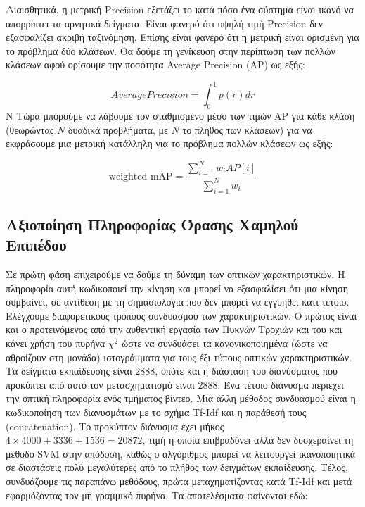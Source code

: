 \documentclass[11pt,a4paper,english,greek,twoside]{../Thesis}
\begin{document}
Διαισθητικά, η μετρική Precision εξετάζει το κατά πόσο ένα σύστημα είναι ικανό να απορρίπτει τα αρνητικά δείγματα. Είναι φανερό ότι υψηλή τιμή Precision δεν εξασφαλίζει ακριβή ταξινόμηση. Επίσης είναι φανερό ότι η μετρική είναι ορισμένη για το πρόβλημα δύο κλάσεων. Θα δούμε τη γενίκευση στην περίπτωση των πολλών κλάσεων αφού ορίσουμε την ποσότητα Average Precision (AP) ως εξής:

\begin{equation}\label{eq:APrecision}
    Average Precision=\int_0^{1} p(r)dr
\end{equation}N
Τώρα μπορούμε να λάβουμε τον σταθμισμένο μέσο των τιμών AP για κάθε κλάση (θεωρώντας $N$ δυαδικά προβλήματα, με $N$ το πλήθος των κλάσεων) για να εκφράσουμε μια μετρική κατάλληλη για το πρόβλημα πολλών κλάσεων ως εξής:

\begin{equation}\label{eq:mAP}
    \text{weighted mAP}=\frac{\sum_{i=1}^{N}w_iAP[i]}{\sum_{i=1}^{N} w_i}
\end{equation}


\subsection{Αξιοποίηση Πληροφορίας Όρασης Χαμηλού Επιπέδου}
Σε πρώτη φάση επιχειρούμε να δούμε τη δύναμη των οπτικών χαρακτηριστικών. Η πληροφορία αυτή κωδικοποιεί την κίνηση και μπορεί να εξασφαλίσει ότι μια κίνηση συμβαίνει, σε αντίθεση με τη σημασιολογία που δεν μπορεί να εγγυηθεί κάτι τέτοιο. Ελέγχουμε διαφορετικούς τρόπους συνδυασμού των χαρακτηριστικών. Ο πρώτος είναι και ο προτεινόμενος από την αυθεντική εργασία των Πυκνών Τροχιών και του \cite{rohrbach_2012} και κάνει χρήση του πυρήνα $\chi^2$ ώστε να συνδυάσει τα κανονικοποιημένα (ώστε να αθροίζουν στη μονάδα) ιστογράμματα για τους έξι τύπους οπτικών χαρακτηριστικών. Τα δείγματα εκπαίδευσης είναι 2888, οπότε και η διάσταση του διανύσματος που προκύπτει από αυτό τον μετασχηματισμό είναι 2888. Ένα τέτοιο διάνυσμα περιέχει την οπτική πληροφορία ενός τμήματος βίντεο. Μια άλλη μέθοδος συνδυασμού είναι η κωδικοποίηση των διανυσμάτων με το σχήμα Tf-Idf και η παράθεσή τους (concatenation). Το προκύπτον διάνυσμα έχει μήκος $4 \times 4000 + 3336 + 1536=20872$, τιμή η οποία επιβραδύνει αλλά δεν δυσχεραίνει τη μέθοδο SVM στην απόδοση, καθώς ο αλγόριθμος μπορεί να λειτουργεί ικανοποιητικά σε διαστάσεις πολύ μεγαλύτερες από το πλήθος των δειγμάτων εκπαίδευσης. Τέλος, συνδυάζουμε τις παραπάνω μεθόδους, πρώτα μεταχηματίζοντας κατά Tf-Idf και μετά εφαρμόζοντας τον μη γραμμικό πυρήνα. Τα αποτελέσματα φαίνονται εδώ:
\end{document}
